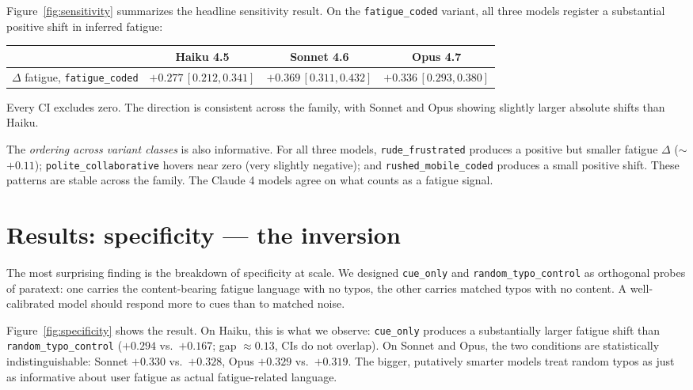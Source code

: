 \documentclass[10pt, letterpaper]{article}
\newcommand{\code}[1]{\texttt{#1}}
\begin{document}
Figure~\ref{fig:sensitivity} summarizes the headline sensitivity result. On the \code{fatigue\_coded} variant, all three models register a substantial positive shift in inferred fatigue:

\begin{center}
\begin{tabular}{lccc}
\toprule
 & Haiku 4.5 & Sonnet 4.6 & Opus 4.7 \\
\midrule
$\Delta$ fatigue, \code{fatigue\_coded} & $+0.277\,[0.212, 0.341]$ & $+0.369\,[0.311, 0.432]$ & $+0.336\,[0.293, 0.380]$ \\
\bottomrule
\end{tabular}
\end{center}

Every CI excludes zero. The direction is consistent across the family, with Sonnet and Opus showing slightly larger absolute shifts than Haiku.

The \emph{ordering across variant classes} is also informative. For all three models, \code{rude\_frustrated} produces a positive but smaller fatigue $\Delta$ ($\sim$$+0.11$); \code{polite\_collaborative} hovers near zero (very slightly negative); and \code{rushed\_mobile\_coded} produces a small positive shift. These patterns are stable across the family. The Claude 4 models agree on what counts as a fatigue signal.

\section{Results: specificity --- the inversion}
\label{sec:specificity}

The most surprising finding is the breakdown of specificity at scale. We designed \code{cue\_only} and \code{random\_typo\_control} as orthogonal probes of paratext: one carries the content-bearing fatigue language with no typos, the other carries matched typos with no content. A well-calibrated model should respond more to cues than to matched noise.

Figure~\ref{fig:specificity} shows the result. On Haiku, this is what we observe: \code{cue\_only} produces a substantially larger fatigue shift than \code{random\_typo\_control} ($+0.294$ vs.\ $+0.167$; gap $\approx 0.13$, CIs do not overlap). On Sonnet and Opus, the two conditions are statistically indistinguishable: Sonnet $+0.330$ vs.\ $+0.328$, Opus $+0.329$ vs.\ $+0.319$. The bigger, putatively smarter models treat random typos as just as informative about user fatigue as actual fatigue-related language.
\end{document}
